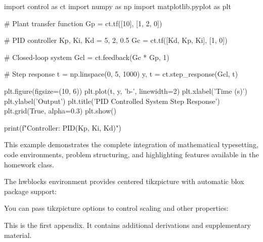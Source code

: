\documentclass{homework}
\begin{document}

\begin{hwpython}[caption=Python Control Systems Verification]
import control as ct
import numpy as np
import matplotlib.pyplot as plt

# Plant transfer function
Gp = ct.tf([10], [1, 2, 0])

# PID controller
Kp, Ki, Kd = 5, 2, 0.5
Gc = ct.tf([Kd, Kp, Ki], [1, 0])

# Closed-loop system  
Gcl = ct.feedback(Gc * Gp, 1)

# Step response
t = np.linspace(0, 5, 1000)
y, t = ct.step_response(Gcl, t)

plt.figure(figsize=(10, 6))
plt.plot(t, y, 'b-', linewidth=2)
plt.xlabel('Time (s)')
plt.ylabel('Output')
plt.title('PID Controlled System Step Response')
plt.grid(True, alpha=0.3)
plt.show()

print(f"Controller: PID({Kp}, {Ki}, {Kd})")
\end{hwpython}

This example demonstrates the complete integration of mathematical typesetting, code environments, problem structuring, and highlighting features available in the homework class.



The hwblocks environment provides centered tikzpicture with automatic blox package support:

\begin{hwblocks}
\end{hwblocks}


You can pass tikzpicture options to control scaling and other properties:

\begin{hwblocks}[scale=0.75, transform shape]
\end{hwblocks}

\hwappendix
This is the first appendix. It contains additional derivations and supplementary material.
\end{document}
